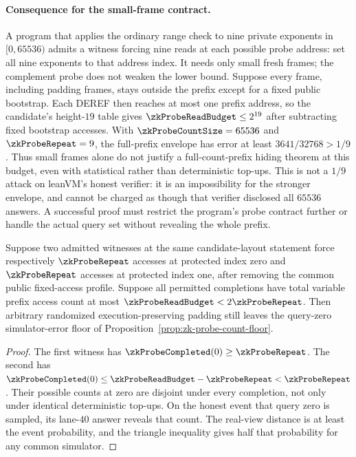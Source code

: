 \paragraph{Consequence for the small-frame contract.} A program that applies the ordinary range check to nine private exponents in $[0,65536)$ admits a witness forcing nine reads at each possible probe address: set all nine exponents to that address index. It needs only small fresh frames; the complement probe does not weaken the lower bound. Suppose every frame, including padding frames, stays outside the prefix except for a fixed public bootstrap. Each DEREF then reaches at most one prefix address, so the candidate's height-$19$ table gives $\zkProbeReadBudget\le2^{19}$ after subtracting fixed bootstrap accesses. With $\zkProbeCountSize=65536$ and $\zkProbeRepeat=9$, the full-prefix envelope has error at least $3641/32768>1/9$. Thus small frames alone do not justify a full-count-prefix hiding theorem at this budget, even with statistical rather than deterministic top-ups. This is not a $1/9$ attack on leanVM's honest verifier: it is an impossibility for the stronger envelope, and cannot be charged as though that verifier disclosed all $65536$ answers. A successful proof must restrict the program's probe contract further or handle the actual query set without revealing the whole prefix.

\begin{corollary}\label{cor:zk-probe-budget-query}
Suppose two admitted witnesses at the same candidate-layout statement force respectively $\zkProbeRepeat$ accesses at protected index zero and $\zkProbeRepeat$ accesses at protected index one, after removing the common public fixed-access profile. Suppose all permitted completions have total variable prefix access count at most $\zkProbeReadBudget<2\zkProbeRepeat$. Then arbitrary randomized execution-preserving padding still leaves the query-zero simulator-error floor of Proposition~\ref{prop:zk-probe-count-floor}.
\end{corollary}
\begin{proof}
The first witness has $\zkProbeCompleted(0)\ge\zkProbeRepeat$. The second has $\zkProbeCompleted(0)\le\zkProbeReadBudget-\zkProbeRepeat<\zkProbeRepeat$. Their possible counts at zero are disjoint under every completion, not only under identical deterministic top-ups. On the honest event that query zero is sampled, its lane-$40$ answer reveals that count. The real-view distance is at least the event probability, and the triangle inequality gives half that probability for any common simulator.
\end{proof}

